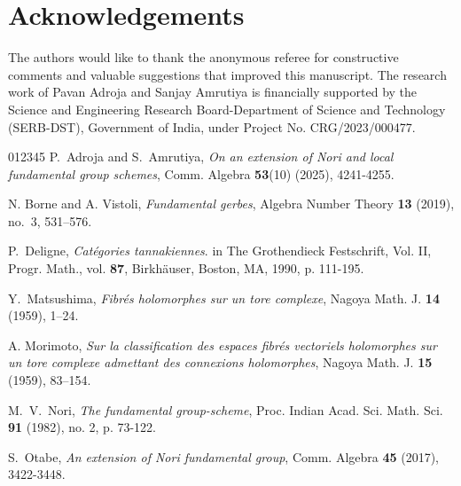 \documentclass[12pt, reqno]{amsart}
\theoremstyle{plain}
\numberwithin{equation}{section}
\begin{document}
\section*{Acknowledgements}
The authors would like to thank the anonymous referee for constructive comments and valuable suggestions that improved this manuscript. The research work of Pavan Adroja and Sanjay Amrutiya is financially supported by the Science and Engineering Research Board-Department of Science and Technology (SERB-DST), Government of India, under Project No. CRG/2023/000477.



\begin{thebibliography}{012345}
 P.~Adroja and S.~Amrutiya, \emph{On an extension of Nori and local fundamental group schemes}, Comm. Algebra \textbf{53}(10) (2025), 4241-4255.

 N. Borne and A. Vistoli, \emph{Fundamental gerbes}, Algebra Number Theory {\bf 13} (2019), no.~3, 531--576.

 P.~Deligne, \emph{Catégories tannakiennes}. in The Grothendieck Festschrift, Vol. II, Progr. Math., vol. \textbf{87}, Birkhäuser, Boston, MA, 1990, p. 111-195.

 Y.~Matsushima, \emph{Fibr\'es holomorphes sur un tore complexe}, Nagoya Math. J. {\bf 14} (1959), 1--24.

 A. Morimoto, \emph{Sur la classification des espaces fibr\'es vectoriels holomorphes sur un tore complexe admettant des connexions holomorphes}, Nagoya Math. J. {\bf 15} (1959), 83--154.

 M.~V.~Nori, \emph{The fundamental group-scheme}, Proc. Indian Acad. Sci. Math. Sci. \textbf{91} (1982), no. 2, p. 73-122. 
		
 S.~Otabe, \emph{An extension of Nori fundamental group}, Comm. Algebra \textbf{45} (2017), 3422-3448.



\end{thebibliography}
\end{document}

